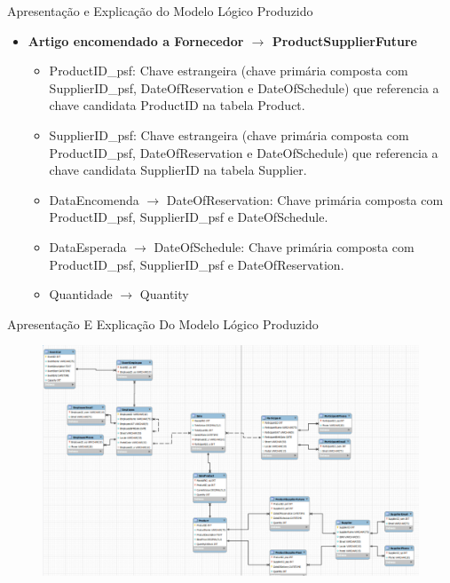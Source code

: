 \documentclass[compress,svgnames,handout,13.7pt]{beamer}
\begin{document}
\begin{frame}{Apresentação e Explicação do Modelo Lógico Produzido}
    \begin{itemize}
        \item{\textbf{Artigo encomendado a Fornecedor $\rightarrow$ ProductSupplierFuture}}
            \begin{itemize}
                \item{ProductID\_psf:} Chave estrangeira (chave primária composta com SupplierID\_psf, 
                DateOfReservation e DateOfSchedule) que referencia a chave candidata ProductID na tabela Product.
                \item{SupplierID\_psf:} Chave estrangeira (chave primária composta com ProductID\_psf,
                DateOfReservation e DateOfSchedule) que referencia a chave candidata SupplierID na tabela Supplier.
                \item{DataEncomenda $\rightarrow$ DateOfReservation:} Chave primária composta com ProductID\_psf, SupplierID\_psf e DateOfSchedule.
                \item{DataEsperada $\rightarrow$ DateOfSchedule:} Chave primária composta com ProductID\_psf, 
                SupplierID\_psf e DateOfReservation.
                \item{Quantidade $\rightarrow$ Quantity}
            \end{itemize}
    \end{itemize}
\end{frame}

\begin{frame}{Apresentação E Explicação Do Modelo Lógico Produzido}
\begin{figure}
    \centering
    \includegraphics[width=4.7in]{images/Logico}
\end{figure}
\end{frame}
\end{document}
